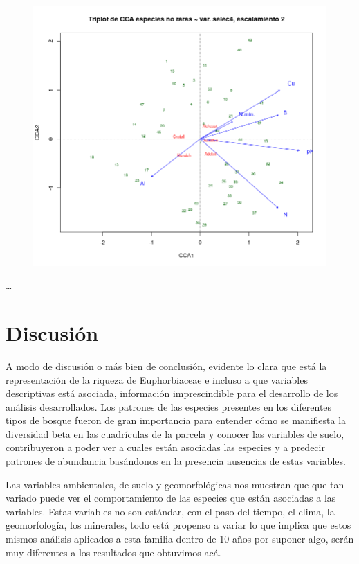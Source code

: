 \documentclass[11pt,]{article}
\begin{document}
\begin{figure}
\centering
\includegraphics{no_raras.png}
\caption{\label{fig:no_raras}}
\end{figure}

\ldots

\section{Discusión}\label{discusiuxf3n}

A modo de discusión o más bien de conclusión, evidente lo clara que está
la representación de la riqueza de Euphorbiaceae e incluso a que
variables descriptivas está asociada, información imprescindible para el
desarrollo de los análisis desarrollados. Los patrones de las especies
presentes en los diferentes tipos de bosque fueron de gran importancia
para entender cómo se manifiesta la diversidad beta en las cuadrículas
de la parcela y conocer las variables de suelo, contribuyeron a poder
ver a cuales están asociadas las especies y a predecir patrones de
abundancia basándonos en la presencia ausencias de estas variables.

Las variables ambientales, de suelo y geomorfológicas nos muestran que
que tan variado puede ver el comportamiento de las especies que están
asociadas a las variables. Estas variables no son estándar, con el paso
del tiempo, el clima, la geomorfología, los minerales, todo está
propenso a variar lo que implica que estos mismos análisis aplicados a
esta familia dentro de 10 años por suponer algo, serán muy diferentes a
los resultados que obtuvimos acá.
\end{document}
